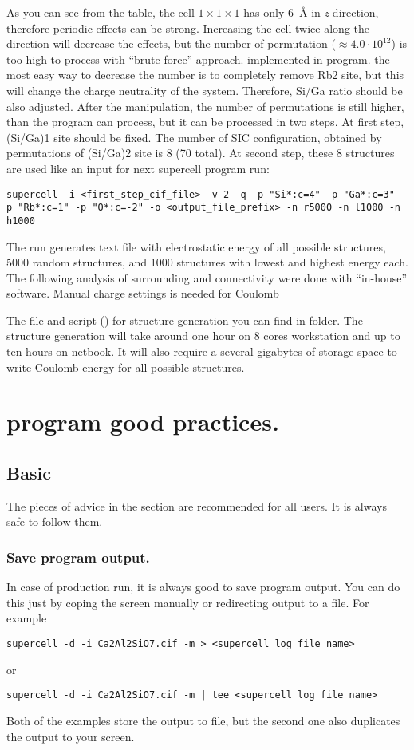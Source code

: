 \documentclass[a4paper,10pt]{article}
\begin{document}
As you can see from the table, the cell $1\times1\times1$ has only 6~\AA{} in \textit{z}-direction, therefore periodic effects can be strong. Increasing the cell twice along the direction will decrease the effects, but the number of permutation ($\approx4.0\cdot10^{12}$) is too high to process with ``brute-force'' approach. implemented in \sups{} program. the most easy way to decrease the number is to completely remove Rb2 site, but this will change the charge neutrality of the system. Therefore, Si/Ga ratio should be also adjusted. After the manipulation, the number of permutations is still higher, than the program can process, but it can be processed in two steps. At first step, (Si/Ga)1 site should be fixed. The number of SIC configuration, obtained by permutations of (Si/Ga)2 site is 8 (70 total). At second step, these 8 structures are used like an input for next supercell program run:
\begin{Verbatim}[breaklines]
  supercell -i <first_step_cif_file> -v 2 -q -p "Si*:c=4" -p "Ga*:c=3" -p "Rb*:c=1" -p "O*:c=-2" -o <output_file_prefix> -n r5000 -n l1000 -n h1000
\end{Verbatim}

The run generates text file with electrostatic energy of all possible structures, \num{5000} random structures, and \num{1000} structures with lowest and highest energy each. The following analysis of surrounding and connectivity were done with ``in-house'' software. Manual charge settings is needed for Coulomb

The  file and script () for structure generation you can find in  folder. The structure generation will take around one hour on 8 cores workstation and up to ten hours on netbook. It will also require a several gigabytes of storage space to write Coulomb energy for all possible structures.

\section*{\Sups{} program good practices.}
\subsection*{Basic}
The pieces of advice in the section are recommended for all \sups{} users. It is always safe to follow them.
\subsubsection{Save program output.}
In case of production run, it is always good to save program output. You can do this just by coping the screen manually or redirecting output to a file. For example
\begin{Verbatim}[breaklines]
supercell -d -i Ca2Al2SiO7.cif -m > <supercell log file name> 
\end{Verbatim}
or
\begin{Verbatim}[breaklines]
supercell -d -i Ca2Al2SiO7.cif -m | tee <supercell log file name> 
\end{Verbatim}
Both of the examples store the output to file, but the second one also duplicates the output to your screen.
\end{document}
